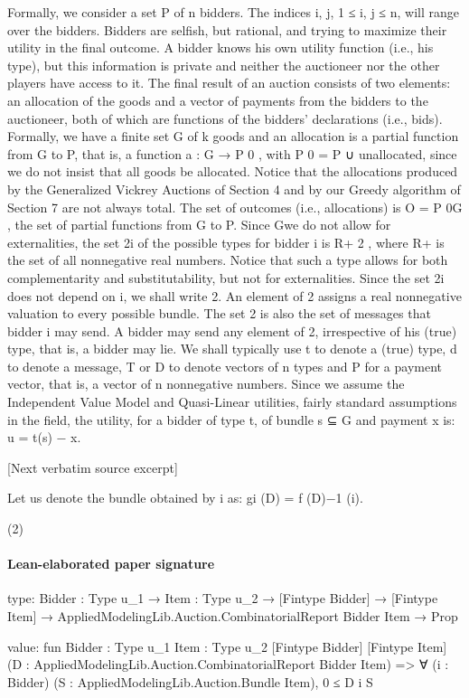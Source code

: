 \documentclass[10pt]{article}
\begin{document}
\begin{ReviewVerbatim}
Formally, we consider a set P of n bidders. The indices i, j, 1 ≤ i, j ≤ n, will
range over the bidders. Bidders are selfish, but rational, and trying to maximize their
utility in the final outcome. A bidder knows his own utility function (i.e., his type),
but this information is private and neither the auctioneer nor the other players have
access to it. The final result of an auction consists of two elements: an allocation
of the goods and a vector of payments from the bidders to the auctioneer, both of
which are functions of the bidders’ declarations (i.e., bids). Formally, we have a
finite set G of k goods and an allocation is a partial function from G to P, that is, a
function a : G → P 0 , with P 0 = P ∪ {unallocated}, since we do not insist that all
goods be allocated. Notice that the allocations produced by the Generalized Vickrey
Auctions of Section 4 and by our Greedy algorithm of Section 7 are not always
total. The set of outcomes (i.e., allocations) is O = P 0G , the set of partial functions
from G to P. Since Gwe do not allow for externalities, the set 2i of the possible types
for bidder i is R+ 2 , where R+ is the set of all nonnegative real numbers. Notice
that such a type allows for both complementarity and substitutability, but not for
externalities. Since the set 2i does not depend on i, we shall write 2. An element
of 2 assigns a real nonnegative valuation to every possible bundle. The set 2 is
also the set of messages that bidder i may send. A bidder may send any element of
2, irrespective of his (true) type, that is, a bidder may lie. We shall typically use t
to denote a (true) type, d to denote a message, T or D to denote vectors of n types
and P for a payment vector, that is, a vector of n nonnegative numbers.
Since we assume the Independent Value Model and Quasi-Linear utilities, fairly
standard assumptions in the field, the utility, for a bidder of type t, of bundle s ⊆ G
and payment x is:
u = t(s) − x.

[Next verbatim source excerpt]

Let us denote the bundle obtained by i as:
gi (D) = f (D)−1 (i).

(2)
\end{ReviewVerbatim}



\paragraph{Lean-elaborated paper signature}
\begin{ReviewVerbatim}
type:
{Bidder : Type u_1} →
  {Item : Type u_2} →
    [Fintype Bidder] → [Fintype Item] → AppliedModelingLib.Auction.CombinatorialReport Bidder Item → Prop

value:
fun {Bidder : Type u_1} {Item : Type u_2} [Fintype Bidder] [Fintype Item]
    (D : AppliedModelingLib.Auction.CombinatorialReport Bidder Item) =>
  ∀ (i : Bidder) (S : AppliedModelingLib.Auction.Bundle Item), 0 ≤ D i S
\end{ReviewVerbatim}
\end{document}
